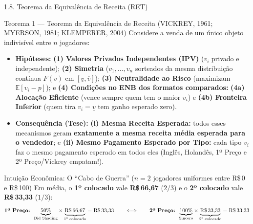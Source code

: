 \documentclass[aspectratio=169, 10pt]{beamer}
\newcommand{\teobox}[2]{%
  \begin{alertblock}{#1}
    \footnotesize\setlength{\abovedisplayskip}{4pt}\setlength{\belowdisplayskip}{4pt}
    #2\par
  \end{alertblock}%
}
\newcommand{\exbox}[2]{%
  \begin{exampleblock}{#1}
    \footnotesize\setlength{\abovedisplayskip}{4pt}\setlength{\belowdisplayskip}{4pt}
    #2\par
  \end{exampleblock}%
}
\begin{document}
\begin{frame}{1.8. Teorema da Equivalência de Receita (RET)}
  \teobox{Teorema 1 --- Teorema da Equivalência de Receita (VICKREY,
  1961; MYERSON, 1981; KLEMPERER, 2004)}{%
    Considere a venda de um único objeto indivisível entre $n$ jogadores:
  \begin{itemize}\setlength{\itemsep}{1.5pt}
      \item \textbf{Hipóteses:} \textbf{(1) Valores Privados
        Independentes (IPV)} ($v_i$ privado e independente);
        \textbf{(2) Simetria} ($v_1, \dots, v_n$ sorteados da mesma
          distribuição contínua $F(v)$ em $[\underline{v},
        \overline{v}]$); \textbf{(3) Neutralidade ao Risco}
        (maximizam $\mathbb{E}[v_i - p]$); e \textbf{(4) Condições no
        ENB dos formatos comparados:} \textbf{(4a) Alocação
        Eficiente} (vence sempre quem tem o maior $v_i$) e
        \textbf{(4b) Fronteira Inferior} (quem tira $v_i =
        \underline{v}$ tem ganho esperado zero).
      \item \textbf{Consequência (Tese):} \textbf{(i) Mesma Receita
        Esperada:} todos esses mecanismos geram \textbf{exatamente a
        mesma receita média esperada para o vendedor}; e \textbf{(ii)
        Mesmo Pagamento Esperado por Tipo:} cada tipo $v_i$ faz o
        mesmo pagamento esperado em todos eles (Inglês, Holandês, 1º
        Preço e 2º Preço/Vickrey empatam!).
    \end{itemize}
  }
  \vspace{-0.1cm}
  \exbox{Intuição Econômica: O ``Cabo de Guerra'' ($n=2$ jogadores
  uniformes entre R\$\,0 e R\$\,100)}{%
    Em média, o \textbf{1º colocado} vale \textbf{R\$\,66,67} ($2/3$)
    e o \textbf{2º colocado} vale \textbf{R\$\,33,33} ($1/3$):
    \[
      \text{\textbf{1º Preço: }} \underbrace{50\%}_{\text{Bid
      Shading}} \times \underbrace{\text{R\$\,66,67}}_{\text{1º
      colocado}} = \mathbf{\text{R\$\,33,33}}
      \qquad \Longleftrightarrow \qquad
      \text{\textbf{2º Preço: }} \underbrace{100\%}_{\text{Sincero}}
      \times \underbrace{\text{R\$\,33,33}}_{\text{2º colocado}} =
      \mathbf{\text{R\$\,33,33}}
    \]
  }
\end{frame}
\end{document}
